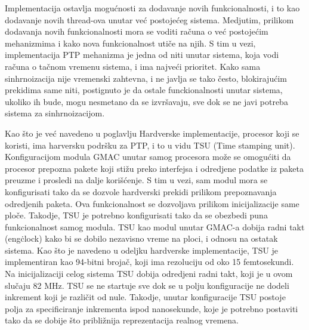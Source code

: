 \documentclass[a4paper,12pt, master]{etf}
\begin{document}
	Implementacija ostavlja mogu\'{c}nosti za dodavanje novih funkcionalnosti,
	i to kao dodavanje novih thread-ova unutar ve\'{c} postoje\'{c}eg sistema.
	Medjutim, prilikom dodavanja novih funkcionalnosti mora se voditi
	ra\v{c}una o ve\'{c} postoje\'{c}im mehanizmima i kako nova funkcionalnost
	uti\v{c}e na njih. S tim u vezi, implementacija PTP mehanizma je jedna od
	niti unutar sistema, koja vodi ra\v{c}una o ta\v{c}nom vremenu sistema, i
	ima najve\'{c}i prioritet. Kako sama sinhrnoizacija nije vremenski zahtevna,
	 i ne javlja se tako \v{c}esto, blokiraju\'{c}im prekidima same niti,
	postignuto je da ostale funckionalnosti unutar sistema, ukoliko ih bude,
	mogu nesmetano da se izvr\v{s}avaju, sve dok se ne javi potreba sistema za
	sinhrnoizacijom.

	Kao \v{s}to je ve\'{c} navedeno u poglavlju Hardverske implementacije,
	procesor koji se koristi, ima harversku podr\v{s}ku za PTP, i to u vidu TSU
	(Time stamping unit). Konfiguracijom modula GMAC unutar samog procesora
	mo\v{z}e se omogu\'{c}iti da procesor prepozna pakete koji sti\v{z}u preko
	interfejsa i odredjene podatke iz paketa preuzme i prosledi na dalje
	kori\v{s}\'{c}enje. S tim u vezi, sam modul mora se konfigurisati tako da
	se dozvole hardverski prekidi prilikom prepoznavanja odredjenih paketa. Ova
	funkcionalnost se dozvoljava prilikom inicijalizacije same plo\v{c}e.
	Takodje, TSU je potrebno konfigurisati tako da se obezbedi puna
    funkcionalnost samog modula. TSU kao modul unutar GMAC-a dobija radni takt
	(eng\. clock) kako bi se dobilo nezavisno vreme na ploci, i odnosu na
    ostatak sistema. Kao \v{s}to je navedeno u odeljku hardverske
    implementacije, TSU je implementiran kao 94-bitni broja\v{c}, koji ima
	rezoluciju od oko 15 femtosekundi. Na inicijalizaciji celog sistema TSU
	dobija odredjeni radni takt, koji je u ovom slu\v{c}aju 82 MHz. TSU se ne
    startuje sve dok se u polju konfiguracije ne dodeli inkrement koji je
    razli\v{c}it od nule. Takodje, unutar konfiguracije TSU postoje polja za
    specificiranje inkrementa ispod nanosekunde, koje je potrebno postaviti tako
    da se dobije \v{s}to pribli\v{z}nija reprezentacija realnog vremena.
\end{document}
